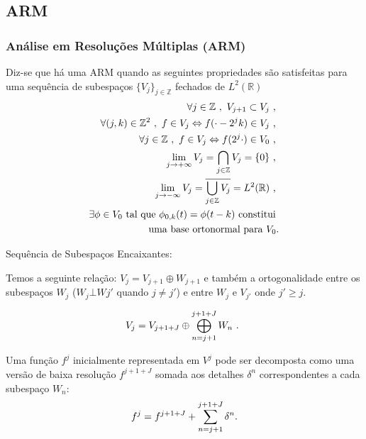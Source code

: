 \subsection{ARM}
\begin{frame}[allowframebreaks]
  \frametitle{Análise em Resoluções Múltiplas (ARM)}
  Diz-se que há uma ARM quando as seguintes propriedades são satisfeitas para 
  uma sequência de subespaços $\{V_j\}_{j \in \mathbb{Z}}$ 
  fechados de $L^2(\mathbb{R})$
  \begin{eqnarray}
  \forall j \in \mathbb{Z} \ , \ V_{j+1} \subset V_{j} \textmd{ , } \label{eq:ARM_1}\\
  \forall (j,k) \in \mathbb{Z}^2 \ , \ f \in V_j \Leftrightarrow f(\cdot - 2^{j}k) \in V_j \textmd{ , } \label{eq:ARM_2}\\
  \forall j \in \mathbb{Z} \ , \ f \in V_j \Leftrightarrow f(2^{j} \cdot) \in V_{0} \textmd{ , } \label{eq:ARM_3}\\
  \lim_{j \rightarrow +\infty} V_j = \bigcap_{j \in \mathbb{Z}} V_j = \{0\} \textmd{ , } \label{eq:ARM_4}\\
  \lim_{j \rightarrow -\infty} V_j = \overline{\bigcup_{j \in \mathbb{Z}} V_j} = L^2(\mathbb{R}) \textmd{ , } \label{eq:ARM_5}\\
  \exists \phi \in V_0 \textmd{ tal que } \phi_{0,k}(t) = \phi(t - k) \textmd{ constitui } \\ \textmd{uma base ortonormal para } V_0 \label{eq:ARM_6} \textmd{.} \nonumber
  \end{eqnarray}

  \framebreak

  Sequência de Subespaços Encaixantes:

  Temos a seguinte relação: $V_j = V_{j+1} \oplus W_{j+1}$
  e também a ortogonalidade entre os subespaços 
  $W_j$ ($W_{j} \bot W{j'}$ quando $j \neq j'$) e entre
  $W_{j}$ e $V_{j'}$ onde $j' \geq j$.
  
  \begin{equation}
  V_{j} = V_{j+1+J} \oplus \bigoplus_{n = j+1}^{j+1+J} W_{n} \textmd{ . }
  \label{eq:sum_subespacos_W}
  \end{equation}
  
  Uma função $f^j$ inicialmente representada em $V^j$ pode ser decomposta 
  como uma versão de baixa resolução $f^{j+1+J}$ somada aos detalhes $\delta^n$
  correspondentes a cada subespaço $W_n$:
  \begin{equation}
  f^j = f^{j+1+J} + \sum_{n = j+1}^{j+1+J} \delta^n \textmd{.}
  \label{eq:decomposicao_funcao_f_J}
  \end{equation}


\end{frame}
